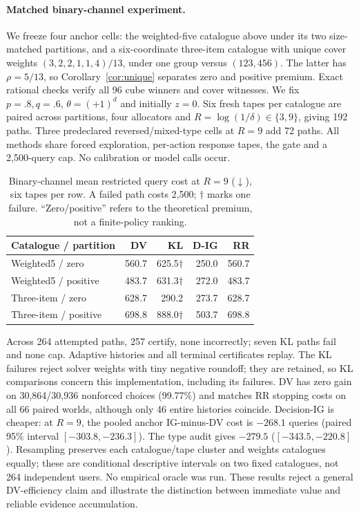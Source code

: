 \paragraph{Matched binary-channel experiment.}
We freeze four anchor cells: the weighted-five catalogue above under its two size-matched partitions, and a six-coordinate three-item catalogue with unique cover weights $(3,2,2,1,1,4)/13$, under one group versus $(123,456)$. The latter has $\rho=5/13$, so Corollary~\ref{cor:unique} separates zero and positive premium. Exact rational checks verify all 96 cube winners and cover witnesses. We fix $p=.8,q=.6$, $\theta=(+1)^d$ and initially $z=0$. Six fresh tapes per catalogue are paired across partitions, four allocators and $R=\log(1/\delta)\in\{3,9\}$, giving 192 paths. Three predeclared reversed/mixed-type cells at $R=9$ add 72 paths. All methods share forced exploration, per-action response tapes, the gate and a 2,500-query cap. No calibration or model calls occur.

\begin{table}[t]
\caption{Binary-channel mean restricted query cost at $R=9$ ($\downarrow$), six tapes per row. A failed path costs 2,500; $\dagger$ marks one failure. ``Zero/positive'' refers to the theoretical premium, not a finite-policy ranking.}
\label{tab:cost}
\centering
\begin{tabular}{lrrrr}
\toprule
Catalogue / partition & DV & KL & D-IG & RR\\
\midrule
Weighted5 / zero & 560.7 & 625.5$\dagger$ & 250.0 & 560.7\\
Weighted5 / positive & 483.7 & 631.3$\dagger$ & 272.0 & 483.7\\
Three-item / zero & 628.7 & 290.2 & 273.7 & 628.7\\
Three-item / positive & 698.8 & 888.0$\dagger$ & 503.7 & 698.8\\
\bottomrule
\end{tabular}
\end{table}

Across 264 attempted paths, 257 certify, none incorrectly; seven KL paths fail and none cap. Adaptive histories and all terminal certificates replay. The KL failures reject solver weights with tiny negative roundoff; they are retained, so KL comparisons concern this implementation, including its failures. DV has zero gain on 30,864/30,936 nonforced choices (99.77\%) and matches RR stopping costs on all 66 paired worlds, although only 46 entire histories coincide. Decision-IG is cheaper: at $R=9$, the pooled anchor IG-minus-DV cost is $-268.1$ queries (paired 95\% interval $[-303.8,-236.3]$). The type audit gives $-279.5$ ($[-343.5,-220.8]$). Resampling preserves each catalogue/tape cluster and weights catalogues equally; these are conditional descriptive intervals on two fixed catalogues, not 264 independent users. No empirical oracle was run. These results reject a general DV-efficiency claim and illustrate the distinction between immediate value and reliable evidence accumulation.

